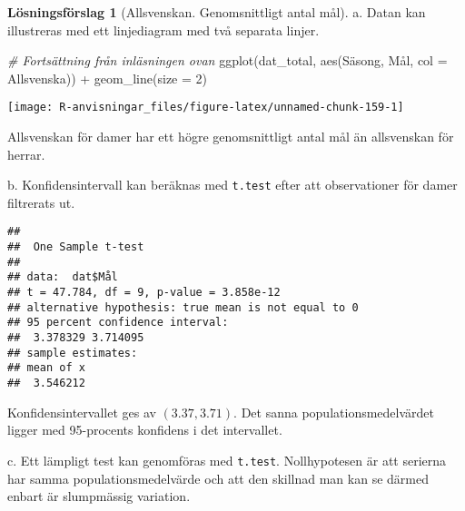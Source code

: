 \documentclass[
]{book}
\newenvironment{Shaded}{\begin{snugshade}}{\end{snugshade}}
\newcommand{\AttributeTok}[1]{\textcolor[rgb]{0.77,0.63,0.00}{#1}}
\newcommand{\CommentTok}[1]{\textcolor[rgb]{0.56,0.35,0.01}{\textit{#1}}}
\newcommand{\DecValTok}[1]{\textcolor[rgb]{0.00,0.00,0.81}{#1}}
\newcommand{\FunctionTok}[1]{\textcolor[rgb]{0.00,0.00,0.00}{#1}}
\newcommand{\NormalTok}[1]{#1}
\newcommand{\OtherTok}[1]{\textcolor[rgb]{0.56,0.35,0.01}{#1}}
\newcommand{\SpecialCharTok}[1]{\textcolor[rgb]{0.00,0.00,0.00}{#1}}
\newcommand{\StringTok}[1]{\textcolor[rgb]{0.31,0.60,0.02}{#1}}
\theoremstyle{definition}
\theoremstyle{definition}
\theoremstyle{definition}
\theoremstyle{definition}
\newtheorem{hypothesis}{Lösningsförslag}[chapter]
\theoremstyle{remark}
\begin{document}
\begin{hypothesis}[Allsvenskan. Genomsnittligt antal mål]
a. Datan kan illustreras med ett linjediagram med två separata linjer.

\begin{Shaded}
\begin{Highlighting}[]
\CommentTok{\# Fortsättning från inläsningen ovan}
\FunctionTok{ggplot}\NormalTok{(dat\_total, }\FunctionTok{aes}\NormalTok{(Säsong, Mål, }\AttributeTok{col =}\NormalTok{ Allsvenska)) }\SpecialCharTok{+}
  \FunctionTok{geom\_line}\NormalTok{(}\AttributeTok{size =} \DecValTok{2}\NormalTok{)}
\end{Highlighting}
\end{Shaded}

\begin{center}\texttt{[image: R-anvisningar\_files/figure-latex/unnamed-chunk-159-1]} \end{center}

Allsvenskan för damer har ett högre genomsnittligt antal mål än allsvenskan för herrar.

b. Konfidensintervall kan beräknas med \texttt{t.test} efter att observationer för damer filtrerats ut.

\begin{Shaded}
\end{Shaded}

\begin{verbatim}
## 
##  One Sample t-test
## 
## data:  dat$Mål
## t = 47.784, df = 9, p-value = 3.858e-12
## alternative hypothesis: true mean is not equal to 0
## 95 percent confidence interval:
##  3.378329 3.714095
## sample estimates:
## mean of x 
##  3.546212
\end{verbatim}

Konfidensintervallet ges av \((3.37, 3.71)\). Det sanna populationsmedelvärdet ligger med 95-procents konfidens i det intervallet.

c. Ett lämpligt test kan genomföras med \texttt{t.test}. Nollhypotesen är att serierna har samma populationsmedelvärde och att den skillnad man kan se därmed enbart är slumpmässig variation.


\end{hypothesis}
\end{document}
